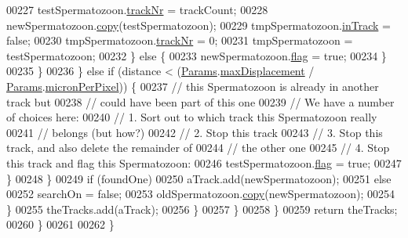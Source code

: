 \begin{DoxyCode}
00227                     testSpermatozoon.\hyperlink{classdata_1_1_spermatozoon_aee0b3af79335b49fe9d9b025cfcde703}{trackNr} = trackCount;
00228                     newSpermatozoon.\hyperlink{classdata_1_1_spermatozoon_ac4622d389badba1a387ec1e139d35c8e}{copy}(testSpermatozoon);
00229                     tmpSpermatozoon.\hyperlink{classdata_1_1_spermatozoon_a204be1963f7e7f07114c1d42360376be}{inTrack} = \textcolor{keyword}{false};
00230                     tmpSpermatozoon.\hyperlink{classdata_1_1_spermatozoon_aee0b3af79335b49fe9d9b025cfcde703}{trackNr} = 0;
00231                     tmpSpermatozoon = testSpermatozoon;
00232                   \} \textcolor{keywordflow}{else} \{
00233                     newSpermatozoon.\hyperlink{classdata_1_1_spermatozoon_ab46c49fb62e0ee61b3865f1e9153fdaa}{flag} = \textcolor{keyword}{true};
00234                   \}
00235                 \}
00236               \} \textcolor{keywordflow}{else} \textcolor{keywordflow}{if} (distance < (\hyperlink{classdata_1_1_params}{Params}.\hyperlink{classdata_1_1_params_ab28f784a26ca9d2ce7d7a785b158aa61}{maxDisplacement} / 
      \hyperlink{classdata_1_1_params}{Params}.\hyperlink{classdata_1_1_params_a19331ee97ef3c422984fc7dff976549e}{micronPerPixel})) \{
00237                 \textcolor{comment}{// this Spermatozoon is already in another track but}
00238                 \textcolor{comment}{// could have been part of this one}
00239                 \textcolor{comment}{// We have a number of choices here:}
00240                 \textcolor{comment}{// 1. Sort out to which track this Spermatozoon really}
00241                 \textcolor{comment}{// belongs (but how?)}
00242                 \textcolor{comment}{// 2. Stop this track}
00243                 \textcolor{comment}{// 3. Stop this track, and also delete the remainder of}
00244                 \textcolor{comment}{// the other one}
00245                 \textcolor{comment}{// 4. Stop this track and flag this Spermatozoon:}
00246                 testSpermatozoon.\hyperlink{classdata_1_1_spermatozoon_ab46c49fb62e0ee61b3865f1e9153fdaa}{flag} = \textcolor{keyword}{true};
00247               \}
00248             \}
00249             \textcolor{keywordflow}{if} (foundOne)
00250               aTrack.add(newSpermatozoon);
00251             \textcolor{keywordflow}{else}
00252               searchOn = \textcolor{keyword}{false};
00253             oldSpermatozoon.\hyperlink{classdata_1_1_spermatozoon_ac4622d389badba1a387ec1e139d35c8e}{copy}(newSpermatozoon);
00254           \}
00255           theTracks.add(aTrack);
00256         \}
00257       \}
00258     \}
00259     \textcolor{keywordflow}{return} theTracks;
00260   \}  
00261 
00262 \}
\end{DoxyCode}
